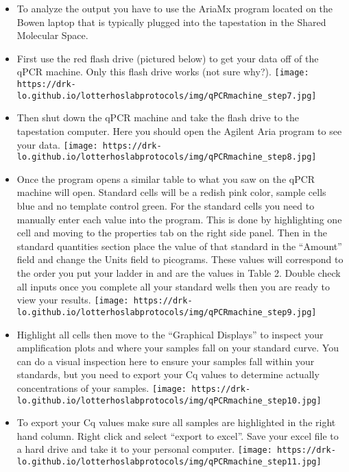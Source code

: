 \documentclass[
  letterpaper,
  DIV=11,
  numbers=noendperiod]{scrreprt}
\begin{document}
\begin{itemize}
\item
  To analyze the output you have to use the AriaMx program located on
  the Bowen laptop that is typically plugged into the tapestation in the
  Shared Molecular Space.
\item
  First use the red flash drive (pictured below) to get your data off of
  the qPCR machine. Only this flash drive works (not sure why?).
  \texttt{[image: https://drk-lo.github.io/lotterhoslabprotocols/img/qPCRmachine\_step7.jpg]}
\item
  Then shut down the qPCR machine and take the flash drive to the
  tapestation computer. Here you should open the Agilent Aria program to
  see your data.
  \texttt{[image: https://drk-lo.github.io/lotterhoslabprotocols/img/qPCRmachine\_step8.jpg]}
\item
  Once the program opens a similar table to what you saw on the qPCR
  machine will open. Standard cells will be a redish pink color, sample
  cells blue and no template control green. For the standard cells you
  need to manually enter each value into the program. This is done by
  highlighting one cell and moving to the properties tab on the right
  side panel. Then in the standard quantities section place the value of
  that standard in the ``Amount'' field and change the Units field to
  picograms. These values will correspond to the order you put your
  ladder in and are the values in Table 2. Double check all inputs once
  you complete all your standard wells then you are ready to view your
  results.
  \texttt{[image: https://drk-lo.github.io/lotterhoslabprotocols/img/qPCRmachine\_step9.jpg]}
\item
  Highlight all cells then move to the ``Graphical Displays'' to inspect
  your amplification plots and where your samples fall on your standard
  curve. You can do a visual inspection here to ensure your samples fall
  within your standards, but you need to export your Cq values to
  determine actually concentrations of your samples.
  \texttt{[image: https://drk-lo.github.io/lotterhoslabprotocols/img/qPCRmachine\_step10.jpg]}
\item
  To export your Cq values make sure all samples are highlighted in the
  right hand column. Right click and select ``export to excel''. Save
  your excel file to a hard drive and take it to your personal computer.
  \texttt{[image: https://drk-lo.github.io/lotterhoslabprotocols/img/qPCRmachine\_step11.jpg]}\\
\end{itemize}
\end{document}
